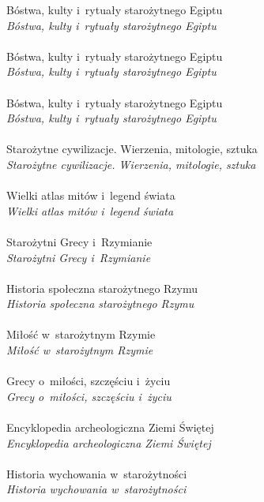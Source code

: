 \documentclass[a4paper,11pt]{article}
\begin{document}
\Jest  Bóstwa, kulty i~rytuały starożytnego Egiptu \\
\Powin \emph{Bóstwa, kulty i~rytuały starożytnego Egiptu} \\
 \\
\Jest  Bóstwa, kulty i~rytuały starożytnego Egiptu \\
\Powin \emph{Bóstwa, kulty i~rytuały starożytnego Egiptu} \\
 \\
\Jest  Bóstwa, kulty i~rytuały starożytnego Egiptu \\
\Powin \emph{Bóstwa, kulty i~rytuały starożytnego Egiptu} \\
 \\
\Jest  Starożytne cywilizacje. Wierzenia, mitologie, sztuka \\
\Powin \emph{Starożytne cywilizacje. Wierzenia, mitologie, sztuka} \\
 \\
\Jest  Wielki atlas mitów i~legend świata \\
\Powin \emph{Wielki atlas mitów i~legend świata} \\
 \\
\Jest  Starożytni Grecy i~Rzymianie \\
\Powin \emph{Starożytni Grecy i~Rzymianie} \\
 \\
\Jest  Historia społeczna starożytnego Rzymu \\
\Powin \emph{Historia społeczna starożytnego Rzymu} \\
 \\
\Jest  Miłość w~starożytnym Rzymie \\
\Powin \emph{Miłość w~starożytnym Rzymie} \\
 \\
\Jest  Grecy o~miłości, szczęściu i~życiu \\
\Powin \emph{Grecy o~miłości, szczęściu i~życiu} \\
 \\
\Jest  Encyklopedia archeologiczna Ziemi Świętej \\
\Powin \emph{Encyklopedia archeologiczna Ziemi Świętej} \\
 \\
\Jest  Historia wychowania w~starożytności \\
\Powin \emph{Historia wychowania w~starożytności} \\
\end{document}
